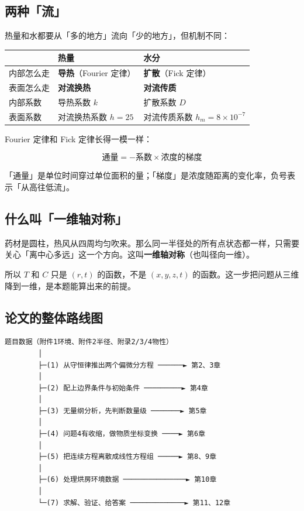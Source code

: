 \subsection{两种「流」}


热量和水都要从「多的地方」流向「少的地方」，但机制不同：


\begin{center}
\small
\begin{tabular}{lll}
\toprule
 & 热量 & 水分 \\
\midrule
内部怎么走 & \textbf{导热}（Fourier 定律） & \textbf{扩散}（Fick 定律） \\
表面怎么走 & \textbf{对流换热} & \textbf{对流传质} \\
内部系数 & 导热系数 $k$ & 扩散系数 $D$ \\
表面系数 & 对流换热系数 $h=25$ & 对流传质系数 $h_m=8\times10^{-7}$ \\
\bottomrule
\end{tabular}
\end{center}


Fourier 定律和 Fick 定律长得一模一样：


\begin{equation*}
\text{通量}=-\text{系数}\times\text{浓度的梯度}
\end{equation*}


「通量」是单位时间穿过单位面积的量；「梯度」是浓度随距离的变化率，负号表示「从高往低流」。


\subsection{什么叫「一维轴对称」}


药材是圆柱，热风从四周均匀吹来。那么同一半径处的所有点状态都一样，只需要关心「离中心多远」这一个方向。这叫\textbf{一维轴对称}（也叫径向一维）。


所以 $T$ 和 $C$ 只是 $(r,t)$ 的函数，不是 $(x,y,z,t)$ 的函数。这一步把问题从三维降到一维，是本题能算出来的前提。


\subsection{论文的整体路线图}


\begin{lstlisting}
题目数据（附件1环境、附件2半径、附录2/3/4物性）
        │
        ├─(1) 从守恒律推出两个偏微分方程 ──────► 第2、3章
        │
        ├─(2) 配上边界条件与初始条件 ─────────► 第4章
        │
        ├─(3) 无量纲分析，先判断数量级 ───────► 第5章
        │
        ├─(4) 问题4有收缩，做物质坐标变换 ────► 第6章
        │
        ├─(5) 把连续方程离散成线性方程组 ─────► 第8、9章
        │
        ├─(6) 处理烘房环境数据 ───────────────► 第10章
        │
        └─(7) 求解、验证、给答案 ─────────────► 第11、12章
\end{lstlisting}


